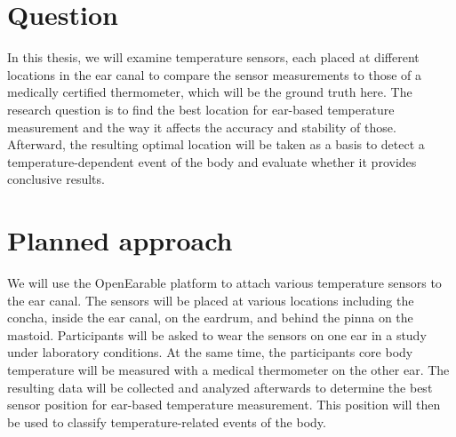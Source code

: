 
\section{Question}
In this thesis, we will examine temperature sensors, each placed at different locations in the ear canal to compare the sensor measurements to those of a medically certified thermometer, which will be the ground truth here. The research question is to find the best location for ear-based temperature measurement and the way it affects the accuracy and stability of those. Afterward, the resulting optimal location will be taken as a basis to detect a temperature-dependent event of the body and evaluate whether it provides conclusive results.




\section{Planned approach}
We will use the OpenEarable platform to attach various temperature sensors to the ear canal. The sensors will be placed at various locations including the concha, inside the ear canal, on the eardrum, and behind the pinna on the mastoid. Participants will be asked to wear the sensors on one ear in a study under laboratory conditions.
At the same time, the participants core body temperature will be measured with a medical thermometer on the other ear.
The resulting data will be collected and analyzed afterwards to determine the best sensor position for ear-based temperature measurement. This position will then be used to classify temperature-related events of the body.


